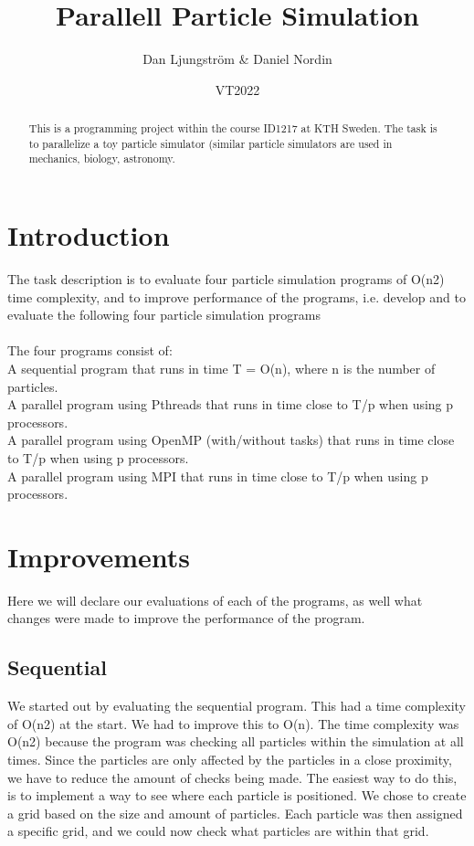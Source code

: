 \documentclass[11pt]{article} %
\title{Parallell Particle Simulation}
\author{Dan Ljungström & Daniel Nordin}
\date{VT2022}
\begin{document}
\begin{abstract}
This is a programming project within the course ID1217 at KTH Sweden. The task is to parallelize a toy particle simulator (similar particle simulators are used in mechanics, biology, astronomy.
\end{abstract}


\newpage
\section{Introduction}
The task description is to evaluate four particle simulation programs of O(n2) time complexity, and to improve performance of the programs, i.e. develop and to evaluate the following four particle simulation programs
\\
\\
The four programs consist of:\\
A sequential program that runs in time T = O(n), where n is the number of particles.\\
A parallel program using Pthreads that runs in time close to T/p when using p processors.\\
A parallel program using OpenMP (with/without tasks) that runs in time close to T/p when using p processors.\\
A parallel program using MPI that runs in time close to T/p when using p processors.\\

\section{Improvements}
Here we will declare our evaluations of each of the programs, as well what changes were made to improve the performance of the program.
\subsection{Sequential}
We started out by evaluating the sequential program. This had a time complexity of O(n2) at the start. We had to improve this to O(n).
The time complexity was O(n2) because the program was checking all particles within the simulation at all times. Since the particles are only affected by the particles in a close proximity, we have to reduce the amount of checks being made.
The easiest way to do this, is to implement a way to see where each particle is positioned. We chose to create a grid based on the size and amount of particles. Each particle was then assigned a specific grid, and we could now check what particles are within that grid.
\end{document}
